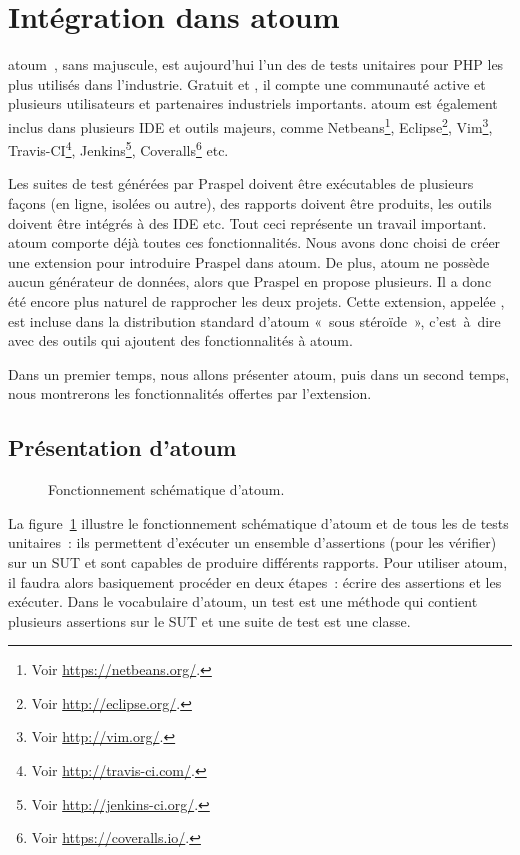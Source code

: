 \section{Intégration dans atoum}
\label{section:tools:atoum}

atoum~, sans majuscule, est aujourd'hui l'un des
 de tests unitaires pour PHP les plus utilisés dans
l'industrie. Gratuit et , il compte une communauté
active et plusieurs utilisateurs et partenaires industriels importants. atoum
est également inclus dans plusieurs IDE et outils majeurs, comme
Netbeans\footnote{Voir \url{https://netbeans.org/}.}, Eclipse\footnote{Voir
\url{http://eclipse.org/}.}, Vim\footnote{Voir \url{http://vim.org/}.},
Travis-CI\footnote{Voir \url{http://travis-ci.com/}.}, Jenkins\footnote{Voir
\url{http://jenkins-ci.org/}.}, Coveralls\footnote{Voir
\url{https://coveralls.io/}.} etc.

Les suites de test générées par Praspel doivent être exécutables de plusieurs
façons (en ligne, isolées ou autre), des rapports doivent être produits, les
outils doivent être intégrés à des IDE etc. Tout ceci représente un travail
important. atoum comporte déjà toutes ces fonctionnalités. Nous avons donc
choisi de créer une extension pour introduire Praspel dans atoum. De plus, atoum
ne possède aucun générateur de données, alors que Praspel en propose plusieurs.
Il a donc été encore plus naturel de rapprocher les deux projets. Cette
extension, appelée , est incluse dans la
distribution standard d'atoum «~sous stéroïde~», c'est~à~dire avec des outils
qui ajoutent des fonctionnalités à atoum.

Dans un premier temps, nous allons présenter atoum, puis dans un second temps,
nous montrerons les fonctionnalités offertes par l'extension.

\subsection{Présentation d'atoum}

\begin{figure}


\caption{\label{figure:tools:atoum} Fonctionnement schématique d'atoum.}

\end{figure}

La figure~\ref{figure:tools:atoum} illustre le fonctionnement schématique
d'atoum et de tous les  de tests unitaires~: ils permettent
d'exécuter un ensemble d'assertions (pour les vérifier) sur un SUT et sont
capables de produire différents rapports. Pour utiliser atoum, il faudra alors
basiquement procéder en deux étapes~: écrire des assertions et les exécuter.
Dans le vocabulaire d'atoum, un test est une méthode qui contient plusieurs
assertions sur le SUT et une suite de test est une classe.

